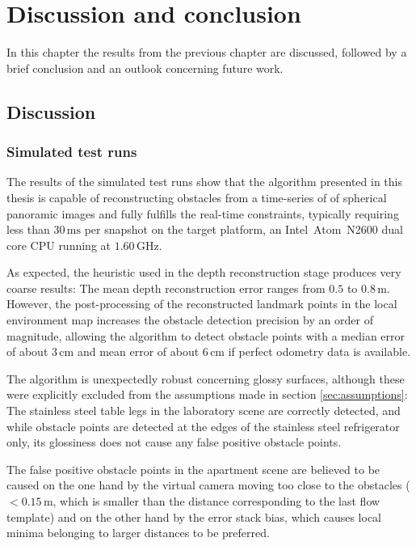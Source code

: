 \chapter{Discussion and conclusion}

In this chapter the results from the previous chapter are discussed, followed by a brief conclusion and an outlook concerning future work.

\section{Discussion}

\subsection{Simulated test runs}

The results of the simulated test runs show that the algorithm presented in this thesis is capable of reconstructing obstacles from a time-series of of spherical panoramic images and fully fulfills the real-time constraints, typically requiring less than $30 \, \mathrm{ms}$ per snapshot on the target platform, an Intel\textregistered\ Atom\texttrademark\ N2600 dual core CPU running at $1{.}60 \, \mathrm{GHz}$.

As expected, the heuristic used in the depth reconstruction stage produces very coarse results: The mean depth reconstruction error ranges from $0.5$ to $0.8 \, \mathrm{m}$. However, the post-processing of the reconstructed landmark points in the local environment map increases the obstacle detection precision by an order of magnitude, allowing the algorithm to detect obstacle points with a median error of about $3 \, \mathrm{cm}$ and mean error of about $6 \, \mathrm{cm}$ if perfect odometry data is available.

The algorithm is unexpectedly robust concerning glossy surfaces, although these were explicitly excluded from the assumptions made in section \ref{sec:assumptions}: The stainless steel table legs in the laboratory scene are correctly detected, and while obstacle points are detected at the edges of the stainless steel refrigerator only, its glossiness does not cause any false positive obstacle points.

The false positive obstacle points in the apartment scene are believed to be caused on the one hand by the virtual camera moving too close to the obstacles ($< 0.15 \, \mathrm{m}$, which is smaller than the distance corresponding to the last flow template) and on the other hand by the error stack bias, which causes local minima belonging to larger distances to be preferred.

